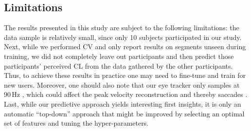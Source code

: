 \documentclass[output=paper]{langsci/langscibook}
\begin{document}
\subsection{Limitations}
The results presented in this study are subject to the following limitations: the data sample is relatively small, since only 10 subjects participated in our study.
Next, while we performed CV and only report results on segments unseen during training, we did not completely leave out participants and then predict those participants' perceived CL from the data gathered by the other participants. Thus, to achieve these results in practice one may need to fine-tune and train for new users. %
Moreover, %
one should also note that our eye tracker only samples at 90\,Hz%
, which could affect the peak velocity reconstruction and thereby saccades \citep{mack2017effect}.
Last, while our predictive approach yields interesting first insights, it is only an automatic ``top-down'' approach that might be improved by selecting an optimal set of features and tuning the hyper-parameters.

\end{document}
